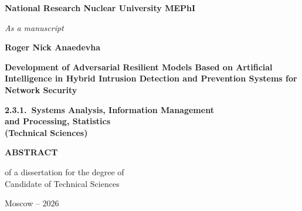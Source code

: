 \documentclass[12pt,a5paper]{article}
\begin{document}
\sloppy

\thispagestyle{empty}

\begin{center}
\textbf{National Research Nuclear University MEPhI}

\vspace{1cm}

\textit{As a manuscript}

\vspace{2cm}

\textbf{Roger Nick Anaedevha}

\vspace{1.5cm}

{\large \textbf{Development of Adversarial Resilient Models
Based on Artificial Intelligence in Hybrid Intrusion
Detection and Prevention Systems for Network Security}}

\vspace{1.5cm}

\textbf{2.3.1.\ Systems Analysis, Information Management\\
and Processing, Statistics\\
(Technical Sciences)}

\vspace{2cm}

\textbf{ABSTRACT}

\vspace{0.5cm}

of a dissertation for the degree of\\
Candidate of Technical Sciences

\vfill

Moscow -- 2026
\end{center}

\newpage

\thispagestyle{empty}
\enlargethispage{1cm}
\end{document}
